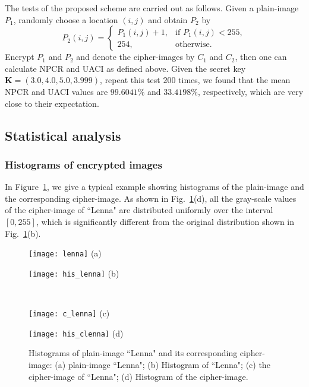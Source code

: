 \documentclass[3p,preprint,11pt]{elsarticle}
\newlength\figwidth
\newlength\imagewidth
\begin{document}
The tests of the proposed scheme are carried out as follows. Given a plain-image $P_1$, randomly choose
a location $(i,j)$ and obtain $P_2$ by
\begin{equation*}
            P_2(i,j) =
            \begin{cases}
            P_1(i,j)+1,     & \text{if } P_1(i,j)< 255,\\
            254, & \text{otherwise}.
            \end{cases}
\end{equation*}
Encrypt $P_1$ and $P_2$ and denote the cipher-images by $C_1$ and $C_2$, then one can calculate NPCR and UACI as defined above.
Given the secret key $\bm{K} = (3.0, 4.0, 5.0, 3.999)$, repeat this test $200$ times,
we found that the mean NPCR and UACI values are $99.6041\%$ and $33.4198\%$, respectively,
which are very close to their expectation.

\subsection{Statistical analysis}
\subsubsection{Histograms of encrypted images}
In Figure~\ref{figure:histograms}, we give a typical example showing histograms of the plain-image and
the corresponding cipher-image. As shown in Fig.~\ref{figure:histograms}(d), all the gray-scale values
of the cipher-image of ``Lenna" are distributed uniformly over the interval $[0,255]$, which is significantly
different from the original distribution shown in Fig.~\ref{figure:histograms}(b).
\begin{figure}[!htb]
\centering
\begin{minipage}{\figwidth}
\texttt{[image: lenna]}
\center (a)
\end{minipage}
\begin{minipage}{\imagewidth}
\texttt{[image: his\_lenna]}
\center (b)
\end{minipage}\\
\begin{minipage}{\figwidth}
\texttt{[image: c\_lenna]}
\center (c)
\end{minipage}
\begin{minipage}{\imagewidth}
\texttt{[image: his\_clenna]}
\center (d)
\end{minipage}
\caption{Histograms of plain-image ``Lenna" and its corresponding cipher-image:
(a) plain-image ``Lenna";
(b) Histogram of ``Lenna";
(c) the cipher-image of ``Lenna";
(d) Histogram of the cipher-image.}
\label{figure:histograms}
\end{figure}
\end{document}
